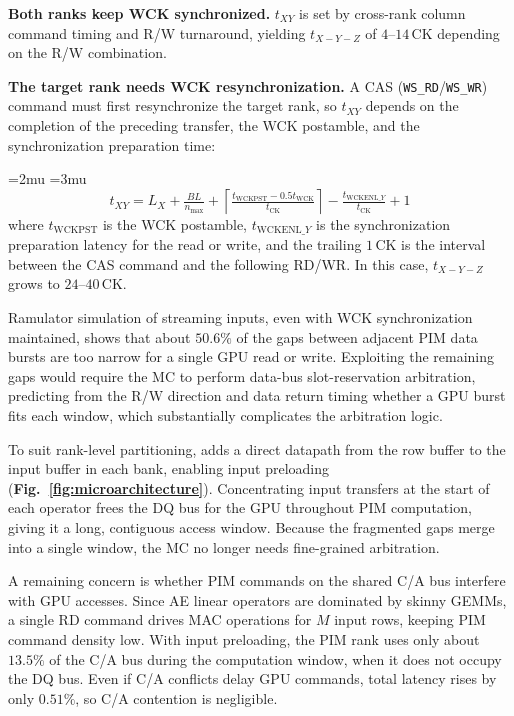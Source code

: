 \textbf{Both ranks keep WCK synchronized.} $t_{XY}$ is set by cross-rank column command timing and R/W turnaround, yielding $t_{X-Y-Z}$ of $4$--$14\,\mathrm{CK}$ depending on the R/W combination.

\textbf{The target rank needs WCK resynchronization.} A CAS (\texttt{WS\_RD}/\texttt{WS\_WR}) command must first resynchronize the target rank, so $t_{XY}$ depends on the completion of the preceding transfer, the WCK postamble, and the synchronization preparation time:

\begingroup
\small
\medmuskip=2mu
\thickmuskip=3mu
\begin{equation}
t_{XY}=L_X+\tfrac{BL}{n_{\max}}
+\left\lceil\tfrac{t_{\mathrm{WCKPST}}-0.5t_{\mathrm{WCK}}}{t_{\mathrm{CK}}}\right\rceil
-\tfrac{t_{\mathrm{WCKENL\_}Y}}{t_{\mathrm{CK}}}+1
\label{eq:rank-resync-command-gap}
\end{equation}
\endgroup
where $t_{\mathrm{WCKPST}}$ is the WCK postamble, $t_{\mathrm{WCKENL\_}Y}$ is the synchronization preparation latency for the read or write, and the trailing $1\,\mathrm{CK}$ is the interval between the CAS command and the following RD/WR. In this case, $t_{X-Y-Z}$ grows to $24$--$40\,\mathrm{CK}$.

Ramulator simulation of streaming inputs, even with WCK synchronization maintained, shows that about $50.6\%$ of the gaps between adjacent PIM data bursts are too narrow for a single GPU read or write. Exploiting the remaining gaps would require the MC to perform data-bus slot-reservation arbitration, predicting from the R/W direction and data return timing whether a GPU burst fits each window, which substantially complicates the arbitration logic.

To suit rank-level partitioning, \sys{} adds a direct datapath from the row buffer to the input buffer in each bank, enabling input preloading (\textbf{Fig.~\ref{fig:microarchitecture}}). Concentrating input transfers at the start of each operator frees the DQ bus for the GPU throughout PIM computation, giving it a long, contiguous access window. Because the fragmented gaps merge into a single window, the MC no longer needs fine-grained arbitration.

A remaining concern is whether PIM commands on the shared C/A bus interfere with GPU accesses. Since AE linear operators are dominated by skinny GEMMs, a single RD command drives MAC operations for $M$ input rows, keeping PIM command density low. With input preloading, the PIM rank uses only about $13.5\%$ of the C/A bus during the computation window, when it does not occupy the DQ bus. Even if C/A conflicts delay GPU commands, total latency rises by only $0.51\%$, so C/A contention is negligible.

